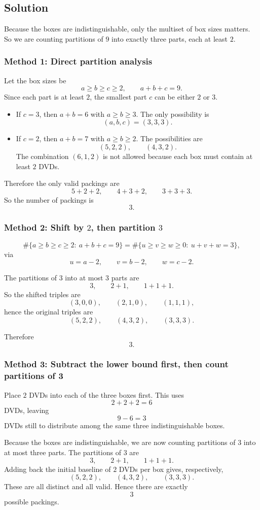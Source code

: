 \documentclass[12pt]{article}
\begin{document}
\subsection{Solution}
Because the boxes are indistinguishable, only the multiset of box sizes matters. So we are counting partitions of $9$ into exactly three parts, each at least $2$.

\subsubsection{Method 1: Direct partition analysis}
Let the box sizes be
\[
a\ge b\ge c\ge 2,
\qquad a+b+c=9.
\]
Since each part is at least $2$, the smallest part $c$ can be either $2$ or $3$.

\begin{itemize}[leftmargin=*]
  \item If $c=3$, then $a+b=6$ with $a\ge b\ge 3$. The only possibility is
  \[
  (a,b,c)=(3,3,3).
  \]
  \item If $c=2$, then $a+b=7$ with $a\ge b\ge 2$. The possibilities are
  \[
  (5,2,2), \qquad (4,3,2).
  \]
  The combination $(6,1,2)$ is not allowed because each box must contain at least $2$ DVDs.
\end{itemize}
Therefore the only valid packings are
\[
5+2+2, \qquad 4+3+2, \qquad 3+3+3.
\]
So the number of packings is
\[
\boxed{3}.
\]

\newpage
\subsubsection{Method 2: Shift by \(2\), then partition \(3\)}

\[
\#\{a\ge b\ge c\ge2:\ a+b+c=9\}
=
\#\{u\ge v\ge w\ge0:\ u+v+w=3\},
\]
via
\[
u=a-2,\qquad v=b-2,\qquad w=c-2.
\]

The partitions of \(3\) into at most \(3\) parts are
\[
3,\qquad 2+1,\qquad 1+1+1.
\]
So the shifted triples are
\[
(3,0,0),\qquad (2,1,0),\qquad (1,1,1),
\]
hence the original triples are
\[
(5,2,2),\qquad (4,3,2),\qquad (3,3,3).
\]

Therefore
\[
\boxed{3}.
\]

\subsubsection{Method 3: Subtract the lower bound first, then count partitions of 3}
Place $2$ DVDs into each of the three boxes first. This uses
\[
2+2+2=6
\]
DVDs, leaving
\[
9-6=3
\]
DVDs still to distribute among the same three indistinguishable boxes.

Because the boxes are indistinguishable, we are now counting partitions of $3$ into at most three parts. The partitions of $3$ are
\[
3, \qquad 2+1, \qquad 1+1+1.
\]
Adding back the initial baseline of $2$ DVDs per box gives, respectively,
\[
(5,2,2), \qquad (4,3,2), \qquad (3,3,3).
\]
These are all distinct and all valid. Hence there are exactly
\[
\boxed{3}
\]
possible packings.
\end{document}
